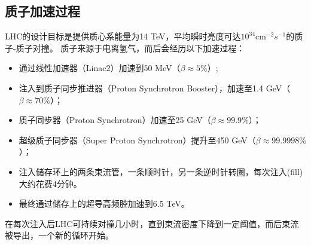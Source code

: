 \subsection{质子加速过程}
LHC的设计目标是提供质心系能量为14 TeV，平均瞬时亮度可达$10^{34} \text{cm}^{-2}s^{-1}$的质子-质子对撞。
质子来源于电离氢气，而后会经历以下加速过程：
\begin{itemize}
  \item 通过线性加速器（Linac2）加速到50 MeV（$\beta\approx5\%$）;
  \item 注入到质子同步推进器（Proton Synchrotron Booster），加速至1.4 GeV（$\beta\approx70\%$）；
  \item 质子同步器（Proton Synchrotron）加速至25 GeV（$\beta\approx99.9\%$）；
  \item 超级质子同步器（Super Proton Synchrotron）提升至450 GeV（$\beta\approx99.9998\%$）；
  \item 注入储存环上的两条束流管，一条顺时针，另一条逆时针转圈，每次注入(fill)大约花费4分钟。
  \item 最终通过储存上的超导高频腔加速到6.5 TeV。
\end{itemize}
在每次注入后LHC可持续对撞几小时，直到束流密度下降到一定阈值，而后束流被导出，一个新的循环开始。


